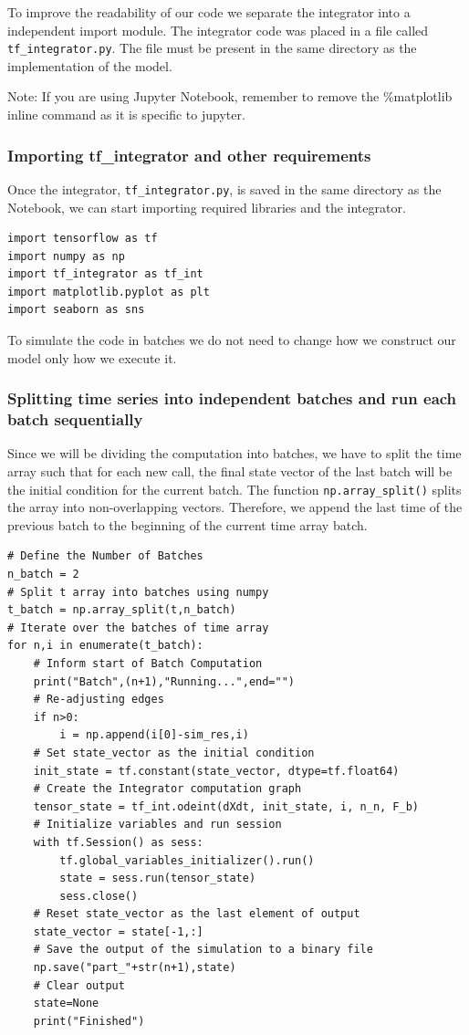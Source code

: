\documentclass[10pt,letterpaper]{article}
\begin{document}
To improve the readability of our code we separate the integrator into a independent import module. The integrator code was placed in a file called \texttt{tf\_integrator.py}. The file must be present in the same directory as the implementation of the model. 

Note: If you are using Jupyter Notebook, remember to remove the \%matplotlib inline command as it is specific to jupyter.

\subsubsection*{Importing tf\_integrator and other requirements}

Once the integrator, \texttt{tf\_integrator.py}, is saved in the same directory as the Notebook, we can start importing required libraries and the integrator.

\begin{verbatim}
import tensorflow as tf
import numpy as np
import tf_integrator as tf_int
import matplotlib.pyplot as plt
import seaborn as sns
\end{verbatim}

To simulate the code in batches we do not need to change how we construct our model only how we execute it.

\subsubsection*{Splitting time series into independent batches and run each batch sequentially}

Since we will be dividing the computation into batches, we have to split the time array such that for each new call, the final state vector of the last batch will be the initial condition for the current batch. The function \texttt{np.array\_split()} splits the array into non-overlapping vectors. Therefore, we append the last time of the previous batch to the beginning of the current time array batch.

\begin{verbatim}
# Define the Number of Batches
n_batch = 2
# Split t array into batches using numpy
t_batch = np.array_split(t,n_batch)
# Iterate over the batches of time array
for n,i in enumerate(t_batch):
    # Inform start of Batch Computation
    print("Batch",(n+1),"Running...",end="")
    # Re-adjusting edges
    if n>0:
        i = np.append(i[0]-sim_res,i)
    # Set state_vector as the initial condition
    init_state = tf.constant(state_vector, dtype=tf.float64)
    # Create the Integrator computation graph
    tensor_state = tf_int.odeint(dXdt, init_state, i, n_n, F_b)
    # Initialize variables and run session
    with tf.Session() as sess:
        tf.global_variables_initializer().run()
        state = sess.run(tensor_state)
        sess.close()
    # Reset state_vector as the last element of output
    state_vector = state[-1,:]
    # Save the output of the simulation to a binary file
    np.save("part_"+str(n+1),state)
    # Clear output
    state=None
    print("Finished")
\end{verbatim}
\end{document}
